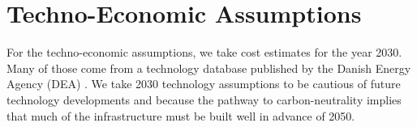 \section{Techno-Economic Assumptions}
\label{sec:si:costs}

For the techno-economic assumptions, we take cost estimates for the year 2030.
Many of those come from a technology database published by the Danish Energy
Agency (DEA) . We take 2030 technology assumptions to be cautious of
future technology developments and because the pathway to carbon-neutrality
implies that much of the infrastructure must be built well in advance of 2050.


% 


\restoregeometry